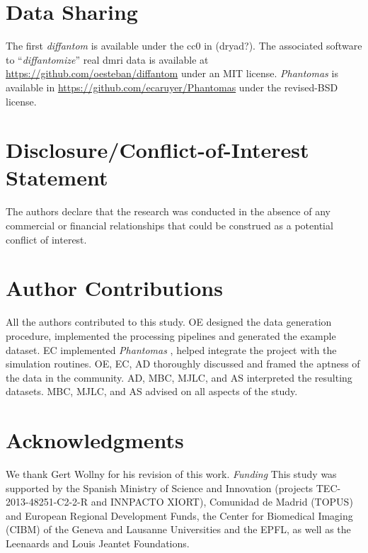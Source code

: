 \documentclass[english]{frontiers/frontiersSCNS} %
\begin{document}
\section*{Data Sharing}
The first \emph{diffantom} is available under the \gls*{cc0} in {\color{red} (dryad?)}.
The associated software to ``\emph{diffantomize}'' real \gls*{dmri} data is available at \url{https://github.com/oesteban/diffantom}
  under an MIT license.
\emph{Phantomas} is available in \url{https://github.com/ecaruyer/Phantomas} under the revised-BSD license.

\section*{Disclosure/Conflict-of-Interest Statement}

The authors declare that the research was conducted in the absence of any commercial or financial relationships that could be construed as a potential conflict of interest.

\section*{Author Contributions}
All the authors contributed to this study.
OE designed the data generation procedure, implemented the processing pipelines and generated the example dataset.
EC implemented \emph{Phantomas} \citep{caruyer_phantomas_2014}, helped integrate the project with the simulation routines.
OE, EC, AD thoroughly discussed and framed the aptness of the data in the community.
AD, MBC, MJLC, and AS interpreted the resulting datasets.
MBC, MJLC, and AS advised on all aspects of the study.


\section*{Acknowledgments}
We thank Gert Wollny for his revision of this work.
\textit{Funding\textcolon}
This study was supported by the Spanish Ministry of Science and Innovation
  (projects TEC-2013-48251-C2-2-R and INNPACTO XIORT), Comunidad de Madrid (TOPUS) and
  European Regional Development Funds, the Center for Biomedical Imaging
  (CIBM) of the Geneva and Lausanne Universities and the EPFL, as well as the
  Leenaards and Louis Jeantet Foundations.

\nolinenumbers


\end{document}
